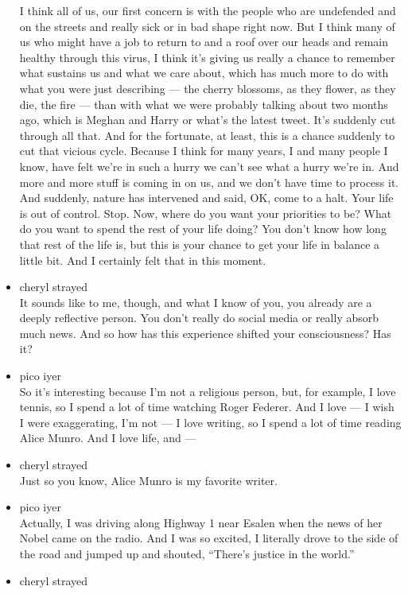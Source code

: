 \begin{itemize}
  I think all of us, our first concern is with the people who are
  undefended and on the streets and really sick or in bad shape right
  now. But I think many of us who might have a job to return to and a
  roof over our heads and remain healthy through this virus, I think
  it's giving us really a chance to remember what sustains us and what
  we care about, which has much more to do with what you were just
  describing --- the cherry blossoms, as they flower, as they die, the
  fire --- than with what we were probably talking about two months ago,
  which is Meghan and Harry or what's the latest tweet. It's suddenly
  cut through all that. And for the fortunate, at least, this is a
  chance suddenly to cut that vicious cycle. Because I think for many
  years, I and many people I know, have felt we're in such a hurry we
  can't see what a hurry we're in. And more and more stuff is coming in
  on us, and we don't have time to process it. And suddenly, nature has
  intervened and said, OK, come to a halt. Your life is out of control.
  Stop. Now, where do you want your priorities to be? What do you want
  to spend the rest of your life doing? You don't know how long that
  rest of the life is, but this is your chance to get your life in
  balance a little bit. And I certainly felt that in this moment.
\item
  cheryl strayed\\
  It sounds like to me, though, and what I know of you, you already are
  a deeply reflective person. You don't really do social media or really
  absorb much news. And so how has this experience shifted your
  consciousness? Has it?
\item
  pico iyer\\
  So it's interesting because I'm not a religious person, but, for
  example, I love tennis, so I spend a lot of time watching Roger
  Federer. And I love --- I wish I were exaggerating, I'm not --- I love
  writing, so I spend a lot of time reading Alice Munro. And I love
  life, and ---
\item
  cheryl strayed\\
  Just so you know, Alice Munro is my favorite writer.
\item
  pico iyer\\
  Actually, I was driving along Highway 1 near Esalen when the news of
  her Nobel came on the radio. And I was so excited, I literally drove
  to the side of the road and jumped up and shouted, ``There's justice
  in the world.''
\item
  cheryl strayed\\

\end{itemize}
